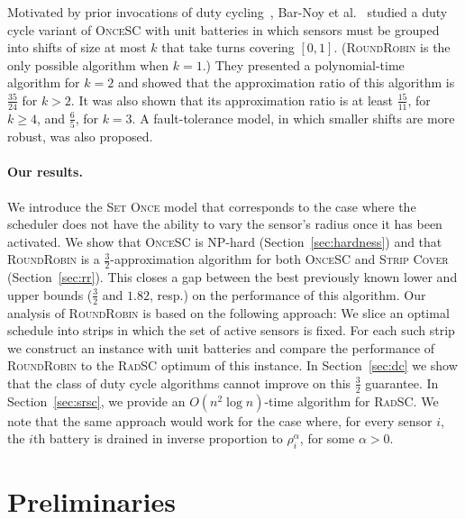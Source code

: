\documentclass[11pt]{article}
\newcommand{\threehalves}{\frac{3}{2}}
\newcommand{\strip}{\textsc{Strip Cover}\xspace}
\newcommand{\sosc}{\textsc{OnceSC}\xspace}
\newcommand{\srsc}{\textsc{RadSC}\xspace}
\newcommand{\rr}{\textsc{RoundRobin}\xspace}
\begin{document}
Motivated by prior invocations of duty
cycling~\cite{slijepcevic2001power,perillo2003optimal,abrams2004set,cardei2005improving,cardei2006improving,cardei2005maximum},
Bar-Noy et al.~\cite{BBR12} studied a duty cycle variant of \sosc with
unit batteries in which sensors must be grouped into shifts of size at
most $k$ that take turns covering $[0,1]$.  (\rr is the only possible
algorithm when $k=1$.)  They presented a polynomial-time algorithm for
$k=2$ and showed that the approximation ratio of this algorithm is
$\frac{35}{24}$ for $k>2$.  It was also shown that its approximation
ratio is at least $\frac{15}{11}$, for $k \geq 4$, and $\frac{6}{5}$,
for $k = 3$. A fault-tolerance model, in which smaller shifts are more
robust, was also proposed.



\paragraph*{\bf Our results.}
We introduce the \textsc{Set Once} model that corresponds to the case
where the scheduler does not have the ability to vary the sensor's
radius once it has been activated.  We show that \sosc is NP-hard
(Section~\ref{sec:hardness}) and that \rr is a
$\threehalves$-approximation algorithm for both \sosc and \strip
(Section~\ref{sec:rr}).  This closes a gap between the best previously
known lower and upper bounds ($\frac{3}{2}$ and $1.82$, resp.) on the
performance of this algorithm.
Our analysis of \rr is based on the following approach:  We slice an
optimal schedule into strips in which the set of active sensors is
fixed.  For each such strip we construct an instance with unit
batteries and compare the performance of \rr to the \srsc optimum of
this instance.
In Section~\ref{sec:dc} we show that the class of duty cycle
algorithms cannot improve on this $\threehalves$ guarantee.
In Section~\ref{sec:srsc}, we provide an $O(n^2 \log{n})$-time
algorithm for \srsc.  We note that the same approach would work for
the case where, for every sensor $i$, the $i$th battery is drained in
inverse proportion to $\rho_i^\alpha$, for some $\alpha>0$.






\section{Preliminaries}
\label{sec:prelim}
\end{document}
